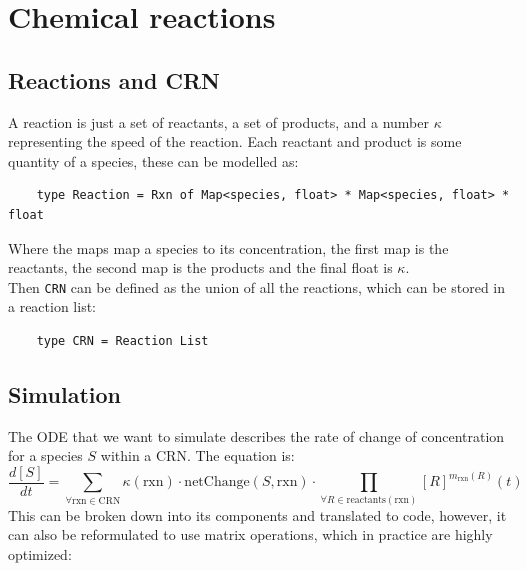 \section{Chemical reactions}

\subsection{Reactions and CRN}
A reaction is just a set of reactants, a set of products, and a number $\kappa$ representing the speed of the reaction. Each reactant and product is some quantity of a species, these can be modelled as:  
\begin{verbatim}
    type Reaction = Rxn of Map<species, float> * Map<species, float> * float
\end{verbatim}
Where the maps map a species to its concentration, the first map is the reactants, the second map is the products and the final float is $\kappa$.\\

Then \texttt{CRN} can be defined as the union of all the reactions, which can be stored in a reaction list:
\begin{verbatim}
    type CRN = Reaction List
\end{verbatim}


\subsection{Simulation}
The ODE that we want to simulate describes the rate of change of concentration for a species \( S \) within a CRN. The equation is:
\[
\frac{d[S]}{dt} = \sum_{\forall \text{rxn} \in \text{CRN}} \kappa(\text{rxn}) \cdot \text{netChange}(S,\text{rxn}) \cdot \prod_{\forall R \in \text{reactants}(\text{rxn})} [R]^{m_{\text{rxn}}(R)}(t)
\]
This can be broken down into its components and translated to code, however, it can also be reformulated to use matrix operations, which in practice are highly optimized:

